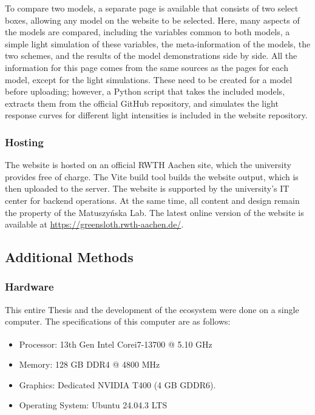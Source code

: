 To compare two models, a separate page is available that consists of two select boxes, allowing any model on the website to be selected. Here, many aspects of the models are compared, including the variables common to both models, a simple light simulation of these variables, the meta-information of the models, the two schemes, and the results of the model demonstrations side by side. All the information for this page comes from the same sources as the pages for each model, except for the light simulations. These need to be created for a model before uploading; however, a Python script that takes the included models, extracts them from the official \greensloth{} GitHub repository, and simulates the light response curves for different light intensities is included in the website repository.

\subsubsection{Hosting}

The website is hosted on an official RWTH Aachen site, which the university provides free of charge. The Vite build tool builds the website output, which is then uploaded to the server. The website is supported by the university's IT center for backend operations. At the same time, all content and design remain the property of the Matuszyńska Lab. The latest online version of the website is available at \url{https://greensloth.rwth-aachen.de/}.

\subsection{Additional Methods}

\subsubsection{Hardware}

This entire Thesis and the development of the \greensloth{} ecosystem were done on a single computer. The specifications of this computer are as follows:

\begin{itemize}
    \item Processor: 	13th Gen Intel\textsuperscript{\textregistered} Core\texttrademark  i7-13700 @ 5.10 GHz
    \item Memory: 128 GB DDR4 @ 4800 MHz
    \item Graphics: Dedicated NVIDIA T400 (4 GB GDDR6).
    \item Operating System: Ubuntu 24.04.3 LTS
\end{itemize}

